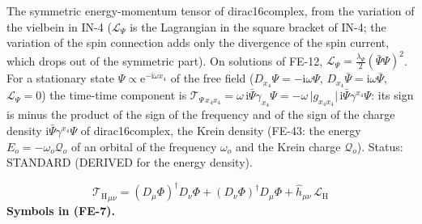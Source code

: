 \documentclass[
  10pt,
]{article}
\begin{document}
The symmetric energy-momentum tensor of dirac16complex, from the
variation of the vielbein in IN-4 (\(\mathcal{L}_\Psi\) is the
Lagrangian in the square bracket of IN-4; the variation of the spin
connection adds only the divergence of the spin current, which drops out
of the symmetric part). On solutions of FE-12,
\(\mathcal{L}_\Psi = \frac{\lambda_\Psi}{2}(\bar\Psi\Psi)^2\). For a
stationary state \(\Psi \propto \mathrm{e}^{-\mathrm{i}\omega x_4}\) of
the free field (\(D_{x_4}\Psi = -\mathrm{i}\omega\Psi\),
\(D_{x_4}\bar\Psi = \mathrm{i}\omega\bar\Psi\),
\(\mathcal{L}_\Psi = 0\)) the time-time component is
\(\mathcal{T}_{\Psi\,x_4x_4} = \omega\,\mathrm{i}\bar\Psi\gamma_{x_4}\Psi = -\omega\,\lvert g_{x_4x_4}\rvert\,\mathrm{i}\bar\Psi\gamma^{x_4}\Psi\):
its sign is minus the product of the sign of the frequency and of the
sign of the charge density \(\mathrm{i}\bar\Psi\gamma^{x_4}\Psi\) of
dirac16complex, the Krein density (FE-43: the energy
\(E_o = -\omega_o\mathcal{Q}_o\) of an orbital of the frequency
\(\omega_o\) and the Krein charge \(\mathcal{Q}_o\)). Status: STANDARD
(DERIVED for the energy density).

\[
{\mathcal{T}_{\mathrm{H}}}_{\mu\nu} = (D_\mu\Phi)^\dagger D_\nu\Phi + (D_\nu\Phi)^\dagger D_\mu\Phi + \hat h_{\mu\nu}\,\mathcal{L}_{\mathrm{H}} \tag{FE-7}
\] \textbf{Symbols in (FE-7).}
\end{document}
